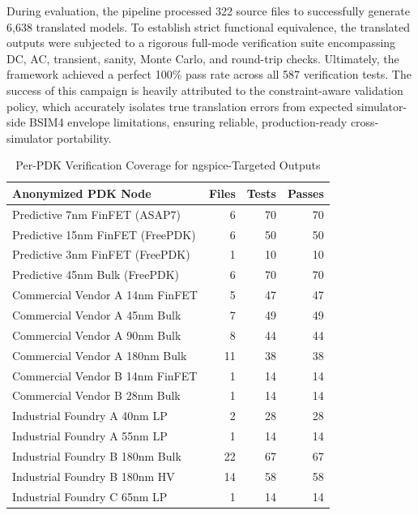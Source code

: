 \documentclass[conference]{IEEEtran}
\begin{document}
During evaluation, the pipeline processed 322 source files to successfully generate 6,638 translated models. To establish strict functional equivalence, the translated outputs were subjected to a rigorous full-mode verification suite encompassing DC, AC, transient, sanity, Monte Carlo, and round-trip checks. Ultimately, the framework achieved a perfect 100\% pass rate across all 587 verification tests. The success of this campaign is heavily attributed to the constraint-aware validation policy, which accurately isolates true translation errors from expected simulator-side BSIM4 envelope limitations, ensuring reliable, production-ready cross-simulator portability.

\begin{table}[!t]
\centering
\caption{Per-PDK Verification Coverage for ngspice-Targeted Outputs}
\label{tab:pdkbreakdown}
\renewcommand{\arraystretch}{1.02}
\begin{tabular}{@{}lrrr@{}}
\toprule
\textbf{Anonymized PDK Node} & \textbf{Files} & \textbf{Tests} & \textbf{Passes} \\
\midrule
Predictive 7nm FinFET (ASAP7) & 6 & 70 & 70 \\
Predictive 15nm FinFET (FreePDK) & 6 & 50 & 50 \\
Predictive 3nm FinFET (FreePDK) & 1 & 10 & 10 \\
Predictive 45nm Bulk (FreePDK) & 6 & 70 & 70 \\
Commercial Vendor A 14nm FinFET & 5 & 47 & 47 \\
Commercial Vendor A 45nm Bulk & 7 & 49 & 49 \\
Commercial Vendor A 90nm Bulk & 8 & 44 & 44 \\
Commercial Vendor A 180nm Bulk & 11 & 38 & 38 \\
Commercial Vendor B 14nm FinFET & 1 & 14 & 14 \\
Commercial Vendor B 28nm Bulk & 1 & 14 & 14 \\
Industrial Foundry A 40nm LP & 2 & 28 & 28 \\
Industrial Foundry A 55nm LP & 1 & 14 & 14 \\
Industrial Foundry B 180nm Bulk & 22 & 67 & 67 \\
Industrial Foundry B 180nm HV & 14 & 58 & 58 \\
Industrial Foundry C 65nm LP & 1 & 14 & 14 \\
\bottomrule
\end{tabular}
\end{table}
\end{document}
